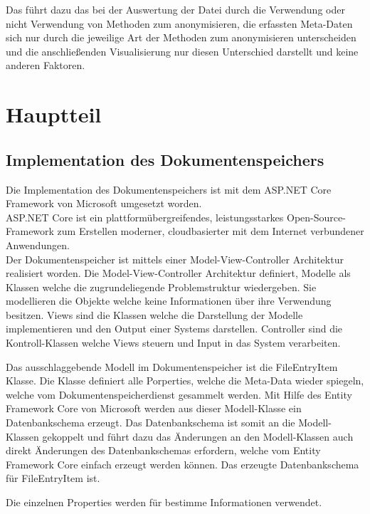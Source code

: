 \documentclass[
    fontsize=12pt,
    headings=small,
    parskip=half,           %
    bibliography=totoc,
    numbers=noenddot,       %
    open=any,               %
    ]{scrreprt}
\begin{document}
Das führt dazu das bei der Auswertung der Datei durch die Verwendung oder nicht Verwendung von Methoden zum anonymisieren, die erfassten Meta-Daten sich nur durch die jeweilige Art der Methoden zum anonymisieren unterscheiden und die anschließenden Visualisierung nur diesen Unterschied darstellt und keine anderen Faktoren. 


\chapter{Hauptteil}

\section{Implementation des Dokumentenspeichers}

Die Implementation des Dokumentenspeichers ist mit dem ASP.NET Core Framework von Microsoft umgesetzt worden. \\
\glqq ASP.NET Core ist ein plattformübergreifendes, leistungsstarkes Open-Source-Framework zum Erstellen moderner, cloudbasierter mit dem Internet verbundener Anwendungen.\grqq \\
Der Dokumentenspeicher ist mittels einer Model-View-Controller Architektur realisiert worden. Die Model-View-Controller Architektur definiert, Modelle als Klassen welche die zugrundeliegende Problemstruktur wiedergeben. Sie modellieren die Objekte welche keine Informationen über ihre Verwendung besitzen. 
Views sind die Klassen welche die Darstellung der Modelle implementieren und den Output einer Systems darstellen. Controller sind die Kontroll-Klassen welche Views steuern und Input in das System verarbeiten. 

Das ausschlaggebende Modell im Dokumentenspeicher ist die FileEntryItem Klasse. Die Klasse definiert alle Porperties, welche die Meta-Data wieder spiegeln, welche vom Dokumentenspeicherdienst gesammelt werden. Mit Hilfe des Entity Framework Core von Microsoft werden aus dieser Modell-Klasse ein Datenbankschema erzeugt. Das Datenbankschema ist somit an die Modell-Klassen gekoppelt und führt dazu das Änderungen an den Modell-Klassen auch direkt Änderungen des Datenbankschemas erfordern, welche vom Entity Framework Core einfach erzeugt werden können. Das erzeugte Datenbankschema für FileEntryItem ist.




Die einzelnen Properties werden für bestimme Informationen verwendet.
\end{document}
